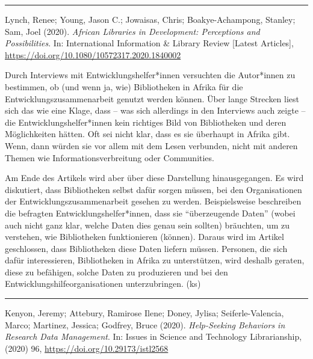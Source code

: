 \documentclass[a4paper,
fontsize=11pt,
oneside,
numbers=noperiodatend,
parskip=half-,
bibliography=totoc,
final
]{scrartcl}
\begin{document}
\begin{center}\rule{0.5\linewidth}{0.5pt}\end{center}

Lynch, Renee; Young, Jason C.; Jowaisas, Chris; Boakye-Achampong,
Stanley; Sam, Joel (2020). \emph{African Libraries in Development:
Perceptions and Possibilities}. In: International Information \& Library
Review {[}Latest Articles{]},
\url{https://doi.org/10.1080/10572317.2020.1840002}

Durch Interviews mit Entwicklungshelfer*innen versuchten die Autor*innen
zu bestimmen, ob (und wenn ja, wie) Bibliotheken in Afrika für die
Entwicklungszusammenarbeit genutzt werden können. Über lange Strecken
liest sich das wie eine Klage, dass -- was sich allerdings in den
Interviews auch zeigte -- die Entwicklungshelfer*innen kein richtiges
Bild von Bibliotheken und deren Möglichkeiten hätten. Oft sei nicht
klar, dass es sie überhaupt in Afrika gibt. Wenn, dann würden sie vor
allem mit dem Lesen verbunden, nicht mit anderen Themen wie
Informationsverbreitung oder Communities.

Am Ende des Artikels wird aber über diese Darstellung hinausgegangen. Es
wird diskutiert, dass Bibliotheken selbst dafür sorgen müssen, bei den
Organisationen der Entwicklungszusammenarbeit gesehen zu werden.
Beispielsweise beschreiben die befragten Entwicklungshelfer*innen, dass
sie \enquote{überzeugende Daten} (wobei auch nicht ganz klar, welche
Daten dies genau sein sollten) bräuchten, um zu verstehen, wie
Bibliotheken funktionieren (können). Daraus wird im Artikel geschlossen,
dass Bibliotheken diese Daten liefern müssen. Personen, die sich dafür
interessieren, Bibliotheken in Afrika zu unterstützen, wird deshalb
geraten, diese zu befähigen, solche Daten zu produzieren und bei den
Entwicklungshilfeorganisationen unterzubringen. (ks)

\begin{center}\rule{0.5\linewidth}{0.5pt}\end{center}

Kenyon, Jeremy; Attebury, Ramirose Ilene; Doney, Jylisa;
Seiferle-Valencia, Marco; Martinez, Jessica; Godfrey, Bruce (2020).
\emph{Help-Seeking Behaviors in Research Data Management}. In: Issues in
Science and Technology Librarianship, (2020) 96,
\url{https://doi.org/10.29173/istl2568}
\end{document}
